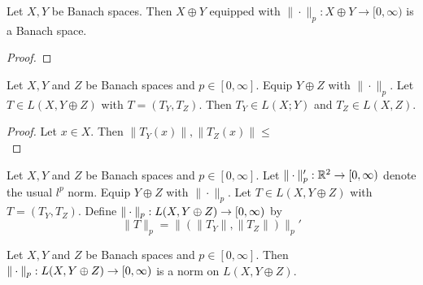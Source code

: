 \documentclass{book}
\begin{document}
\begin{ex} \lex{}	
	Let $X, Y$ be Banach spaces. Then $X \oplus Y$ equipped with $\|\cdot \|_p:X \oplus Y \rightarrow [0, \infty)$ is a Banach space. 
	\end{ex}
	
	\begin{proof}
	
	\end{proof}
	
	\begin{ex}
	Let $X, Y$ and $Z$ be Banach spaces and $p \in [0, \infty]$. Equip $Y \oplus Z$ with $\|\cdot\|_p$. Let $T \in L(X, Y \oplus Z)$ with $T = (T_Y, T_Z)$. Then $T_Y \in L(X; Y)$ and $T_Z \in L(X, Z)$.
	\end{ex}
	
	\begin{proof}
	Let $x \in X$. Then $\|T_Y(x)\|, \|T_Z(x)\| \leq $
	\\ 
	\end{proof}

	\begin{defn}
	Let $X, Y$ and $Z$ be Banach spaces and $p \in [0, \infty]$. Let $\| \cdot \|'_p: \mathbb{R}^2 \rightarrow [0, \infty)$ denote the usual $l^p$ norm. Equip $Y \oplus Z$ with $\|\cdot\|_p$. Let $T \in L(X, Y \oplus Z)$ with $T = (T_Y, T_Z)$. Define $\|\cdot \|_p: L(X, Y \oplus Z) \rightarrow [0,\infty)$ by $$\|T\|_p = \|(\|T_Y\|, \|T_Z\|)\|_p'$$
	\end{defn}
	
	\begin{ex}
	Let $X, Y$ and $Z$ be Banach spaces and $p \in [0, \infty]$. Then $\|\cdot \|_p: L(X, Y \oplus Z) \rightarrow [0,\infty)$ is a norm on $L(X, Y \oplus Z)$. 
	\end{ex}
	
\end{document}
